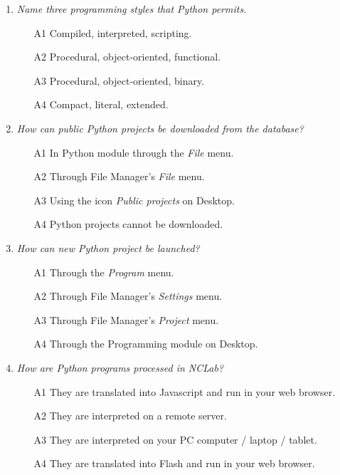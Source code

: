 \begin{enumerate}
\item {\em Name three programming styles that Python permits.}\\

\begin{enumerate}
\item[A1] Compiled, interpreted, scripting.
\item[A2] Procedural, object-oriented, functional.
\item[A3] Procedural, object-oriented, binary.
\item[A4] Compact, literal, extended.
\end{enumerate}
\vspace{4mm}

\item {\em How can public Python projects be downloaded from the database?}\\

\begin{enumerate}
\item[A1] In Python module through the {\em File} menu.
\item[A2] Through File Manager's {\em File} menu.
\item[A3] Using the icon {\em Public projects} on Desktop.
\item[A4] Python projects cannot be downloaded.
\end{enumerate}
\vspace{4mm}

\item {\em How can new Python project be launched?}\\

\begin{enumerate}
\item[A1] Through the {\em Program} menu.
\item[A2] Through File Manager's {\em Settings} menu.
\item[A3] Through File Manager's {\em Project} menu.
\item[A4] Through the Programming module on Desktop.
\end{enumerate}
\vspace{4mm}

\item {\em How are Python programs processed in NCLab?}\\

\begin{enumerate}
\item[A1] They are translated into Javascript and run in your web browser.
\item[A2] They are interpreted on a remote server.
\item[A3] They are interpreted on your PC computer / laptop / tablet.
\item[A4] They are translated into Flash and run in your web browser.
\end{enumerate}
\vspace{4mm}


\end{enumerate}
